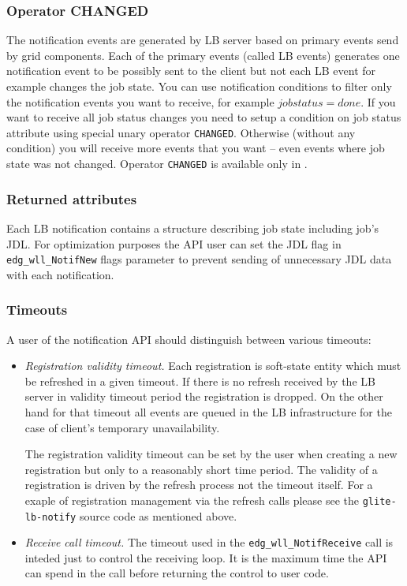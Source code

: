 \subsubsection{Operator CHANGED}
%
The notification events are generated by LB server based on primary
events send by grid components. Each of the primary events (called LB
events) generates one notification event to be possibly sent to the
client but not each LB event for example changes the job state. You
can use notification conditions to filter only the notification
events you want to receive, for example $job status = done$. If you
want to receive all job status changes you need to setup a condition
on job status attribute using special unary operator
\verb'CHANGED'. Otherwise (without any condition) you will receive
more events that you want -- even events where job state was not
changed. Operator \verb'CHANGED' is available only in .

\subsubsection{Returned attributes}
%
Each LB notification contains a structure describing job state
including job's JDL. For optimization purposes the API user can set
the JDL flag in \verb'edg_wll_NotifNew' flags parameter to prevent
sending of unnecessary JDL data with each notification.

\subsubsection{Timeouts}
A user of the notification API should distinguish between various timeouts:
\begin{itemize}
\item \emph{Registration validity timeout.} Each registration is
soft-state entity which must be refreshed in a given timeout. If there
is no refresh received by the LB server in validity timeout period the
registration is dropped. On the other hand for that timeout all events
are queued in the LB infrastructure for the case of client's temporary
unavailability.

The registration validity timeout can be set by the user when creating
a new registration but only to a reasonably short time period. The
validity of a registration is driven by the refresh process not the
timeout itself. For a exaple of registration management via the
refresh calls please see the \verb'glite-lb-notify' source code as
mentioned above.

\item \emph{Receive call timeout.} The timeout used in the
\verb'edg_wll_NotifReceive' call is inteded just to control the
receiving loop. It is the maximum time the API can spend in the call
before returning the control to user code.

\end{itemize}

